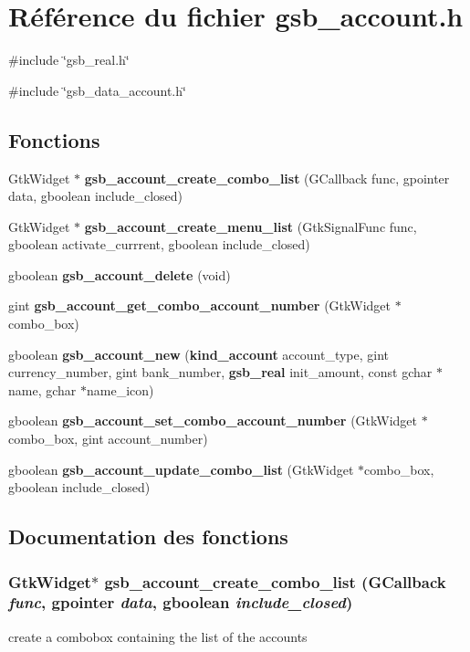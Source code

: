 \section{Référence du fichier gsb\_\-account.h}
\label{gsb__account_8h}
{\ttfamily \#include \char`\"{}gsb\_\-real.h\char`\"{}}\par
{\ttfamily \#include \char`\"{}gsb\_\-data\_\-account.h\char`\"{}}\par
\subsection*{Fonctions}
\begin{DoxyCompactItemize}
\item 
GtkWidget $\ast$ {\bf gsb\_\-account\_\-create\_\-combo\_\-list} (GCallback func, gpointer data, gboolean include\_\-closed)
\item 
GtkWidget $\ast$ {\bf gsb\_\-account\_\-create\_\-menu\_\-list} (GtkSignalFunc func, gboolean activate\_\-currrent, gboolean include\_\-closed)
\item 
gboolean {\bf gsb\_\-account\_\-delete} (void)
\item 
gint {\bf gsb\_\-account\_\-get\_\-combo\_\-account\_\-number} (GtkWidget $\ast$combo\_\-box)
\item 
gboolean {\bf gsb\_\-account\_\-new} ({\bf kind\_\-account} account\_\-type, gint currency\_\-number, gint bank\_\-number, {\bf gsb\_\-real} init\_\-amount, const gchar $\ast$name, gchar $\ast$name\_\-icon)
\item 
gboolean {\bf gsb\_\-account\_\-set\_\-combo\_\-account\_\-number} (GtkWidget $\ast$combo\_\-box, gint account\_\-number)
\item 
gboolean {\bf gsb\_\-account\_\-update\_\-combo\_\-list} (GtkWidget $\ast$combo\_\-box, gboolean include\_\-closed)
\end{DoxyCompactItemize}


\subsection{Documentation des fonctions}
\subsubsection[{gsb\_\-account\_\-create\_\-combo\_\-list}]{\setlength{\rightskip}{0pt plus 5cm}GtkWidget$\ast$ gsb\_\-account\_\-create\_\-combo\_\-list (GCallback {\em func}, \/  gpointer {\em data}, \/  gboolean {\em include\_\-closed})}\label{gsb__account_8h_a252b9f3c12c50f00a1d1db3e4321460c}
create a combobox containing the list of the accounts


